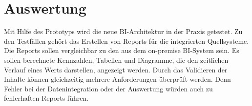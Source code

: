 \section{Auswertung} \label{sec:umsetzung:auswertung}
Mit Hilfe des Prototyps wird die neue BI-Architektur in der Praxis getestet. Zu den Testfällen gehört das Erstellen von Reports für die integrierten Quellsysteme. Die Reports sollen vergleichbar zu den aus dem on-premise BI-System sein. Es sollen berechnete Kennzahlen, Tabellen und Diagramme, die den zeitlichen Verlauf eines Werts darstellen, angezeigt werden. Durch das Validieren der Inhalte können gleichzeitig mehrere Anforderungen überprüft werden. Denn Fehler bei der Datenintegration oder der Auswertung würden auch zu fehlerhaften Reports führen.

